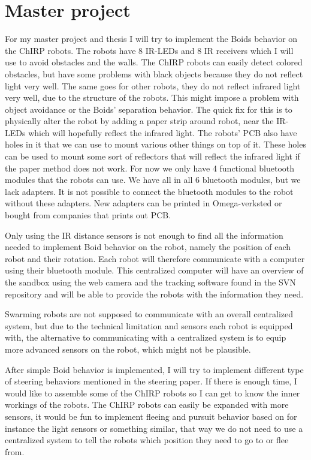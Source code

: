 \section{Master project}
For my master project and thesis I will try to implement the Boids behavior on the ChIRP robots. The robots have 8 IR-LEDs and 8 IR receivers which I will use to avoid obstacles and the walls. The ChIRP robots can easily detect colored obstacles, but have some problems with black objects because they do not reflect light very well. The same goes for other robots, they do not reflect infrared light very well, due to the structure of the robots. This might impose a problem with object avoidance or the Boids' separation behavior. The quick fix for this is to physically alter the robot by adding a paper strip around robot, near the IR-LEDs which will hopefully reflect the infrared light.
The robots' PCB also have holes in it that we can use to mount various other things on top of it. These holes can be used to mount some sort of reflectors that will reflect the infrared light if the paper method does not work.
For now we only have 4 functional bluetooth modules that the robots can use. We have all in all 6 bluetooth modules, but we lack adapters. It is not possible to connect the bluetooth modules to the robot without these adapters. New adapters can be printed in Omega-verksted or bought from companies that prints out PCB.

Only using the IR distance sensors is not enough to find all the information needed to implement Boid behavior on the robot, namely the position of each robot and their rotation.
Each robot will therefore communicate with a computer using their bluetooth module.
This centralized computer will have an overview of the sandbox using the web camera and the tracking software found in the SVN repository and will be able to provide the robots with the information they need.

Swarming robots are not supposed to communicate with an overall centralized system, but due to the technical limitation and sensors each robot is equipped with, the alternative to communicating with a centralized system is to equip more advanced sensors on the robot, which might not be plausible.

After simple Boid behavior is implemented, I will try to implement different type of steering behaviors mentioned in the steering paper. If there is enough time, I would like to assemble some of the ChIRP robots so I can get to know the inner workings of the robots. The ChIRP robots can easily be expanded with more sensors, it would be fun to implement fleeing and pursuit behavior based on for instance the light sensors or something similar, that way we do not need to use a centralized system to tell the robots which position they need to go to or flee from.


